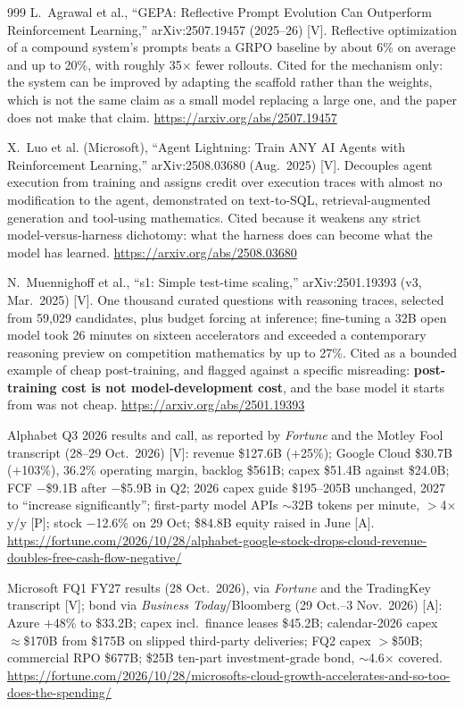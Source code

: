 \begin{thebibliography}{999}
 L.~Agrawal et al., ``GEPA: Reflective Prompt Evolution Can Outperform Reinforcement Learning,'' arXiv:2507.19457 (2025--26) [V]. Reflective optimization of a compound system's prompts beats a GRPO baseline by about 6\% on average and up to 20\%, with roughly 35$\times$ fewer rollouts. Cited for the mechanism only: the system can be improved by adapting the scaffold rather than the weights, which is not the same claim as a small model replacing a large one, and the paper does not make that claim. \url{https://arxiv.org/abs/2507.19457}

 X.~Luo et al. (Microsoft), ``Agent Lightning: Train ANY AI Agents with Reinforcement Learning,'' arXiv:2508.03680 (Aug.\ 2025) [V]. Decouples agent execution from training and assigns credit over execution traces with almost no modification to the agent, demonstrated on text-to-SQL, retrieval-augmented generation and tool-using mathematics. Cited because it weakens any strict model-versus-harness dichotomy: what the harness does can become what the model has learned. \url{https://arxiv.org/abs/2508.03680}

 N.~Muennighoff et al., ``s1: Simple test-time scaling,'' arXiv:2501.19393 (v3, Mar.\ 2025) [V]. One thousand curated questions with reasoning traces, selected from 59,029 candidates, plus budget forcing at inference; fine-tuning a 32B open model took 26 minutes on sixteen accelerators and exceeded a contemporary reasoning preview on competition mathematics by up to 27\%. Cited as a bounded example of cheap post-training, and flagged against a specific misreading: \textbf{post-training cost is not model-development cost}, and the base model it starts from was not cheap. \url{https://arxiv.org/abs/2501.19393}

 Alphabet Q3 2026 results and call, as reported by \emph{Fortune} and the Motley Fool transcript (28--29 Oct.\ 2026) [V]: revenue \$127.6B ($+$25\%); Google Cloud \$30.7B ($+$103\%), 36.2\% operating margin, backlog \$561B; capex \$51.4B against \$24.0B; FCF $-$\$9.1B after $-$\$5.9B in Q2; 2026 capex guide \$195--205B unchanged, 2027 to ``increase significantly''; first-party model APIs $\sim$32B tokens per minute, $>$4$\times$ y/y [P]; stock $-$12.6\% on 29 Oct; \$84.8B equity raised in June [A]. \url{https://fortune.com/2026/10/28/alphabet-google-stock-drops-cloud-revenue-doubles-free-cash-flow-negative/}

 Microsoft FQ1 FY27 results (28 Oct.\ 2026), via \emph{Fortune} and the TradingKey transcript [V]; bond via \emph{Business Today}/Bloomberg (29 Oct.--3 Nov.\ 2026) [A]: Azure $+$48\% to \$33.2B; capex incl.\ finance leases \$45.2B; calendar-2026 capex $\approx$\$170B from \$175B on slipped third-party deliveries; FQ2 capex $>$\$50B; commercial RPO \$677B; \$25B ten-part investment-grade bond, $\sim$4.6$\times$ covered. \url{https://fortune.com/2026/10/28/microsofts-cloud-growth-accelerates-and-so-too-does-the-spending/}


\end{thebibliography}
